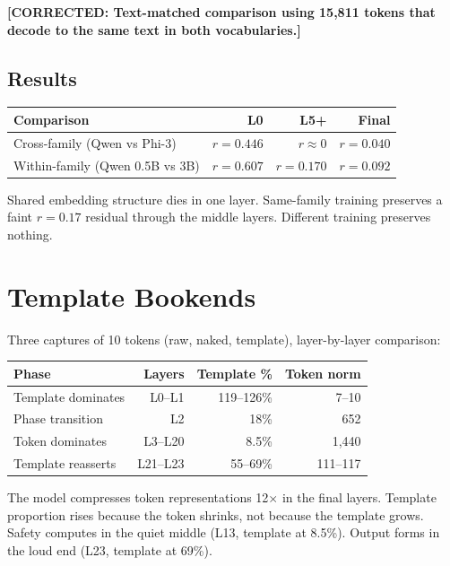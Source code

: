 \documentclass[11pt,a4paper]{report}
\newcommand{\corrected}[1]{\textcolor{corrected}{\textbf{[CORRECTED: #1]}}}
\begin{document}
\corrected{Text-matched comparison using 15,811 tokens that decode to the same text in both vocabularies.}

\section{Results}

\begin{center}
\begin{tabular}{lrrr}
\toprule
\textbf{Comparison} & \textbf{L0} & \textbf{L5+} & \textbf{Final} \\
\midrule
Cross-family (Qwen vs Phi-3) & $r = 0.446$ & $r \approx 0$ & $r = 0.040$ \\
Within-family (Qwen 0.5B vs 3B) & $r = 0.607$ & $r = 0.170$ & $r = 0.092$ \\
\bottomrule
\end{tabular}
\end{center}

Shared embedding structure dies in one layer. Same-family training preserves a faint $r = 0.17$ residual through the middle layers. Different training preserves nothing.

\chapter{Template Bookends}

Three captures of 10 tokens (raw, naked, template), layer-by-layer comparison:

\begin{center}
\begin{tabular}{lrrr}
\toprule
\textbf{Phase} & \textbf{Layers} & \textbf{Template \%} & \textbf{Token norm} \\
\midrule
Template dominates & L0--L1 & 119--126\% & 7--10 \\
Phase transition & L2 & 18\% & 652 \\
Token dominates & L3--L20 & 8.5\% & 1,440 \\
Template reasserts & L21--L23 & 55--69\% & 111--117 \\
\bottomrule
\end{tabular}
\end{center}

The model compresses token representations 12$\times$ in the final layers. Template proportion rises because the token shrinks, not because the template grows. Safety computes in the quiet middle (L13, template at 8.5\%). Output forms in the loud end (L23, template at 69\%).
\end{document}

